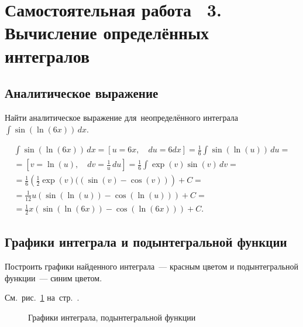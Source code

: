 \documentclass[10pt, a4paper, titlepage]{article}
\begin{document}
\clearpage
\section{Самостоятельная работа \textnumero~3. Вычисление определённых интегралов}

\subsection*{Аналитическое выражение}

Найти аналитическое выражение для~неопределённого интеграла $\int \sin(\ln(6x))\,dx$.

\begin{multline*}
    \int\sin(\ln(6x))\,dx =
    \left[u=6x, \quad du=6dx\right] =
    \frac{1}{6}\int\sin(\ln(u))\,du = \\ =
    \left[v=\ln(u), \quad dv=\frac{1}{u}\,du\right] =
    \frac{1}{6}\int\exp(v)\sin(v)\,dv = \\ =
    \frac{1}{6}\left(\frac{1}{2}\exp(v)((\sin(v)-\cos(v))\right)+C = \\ =
    \frac{1}{12}u(\sin(\ln(u))-\cos(\ln(u)))+C = \\ =
    \frac{1}{2}x(\sin(\ln(6x))-\cos(\ln(6x)))+C.
\end{multline*}

\subsection*{Графики интеграла и подынтегральной функции}

Построить графики найденного интеграла~--- красным цветом и подынтегральной функции~--- синим цветом.

См.~рис.~\ref{sr3Functions} на~стр.~\pageref{sr3Functions}.

\begin{figure}[htb]
    \caption{Графики интеграла, подынтегральной функции}
    \label{sr3Functions}
\end{figure}
\end{document}
